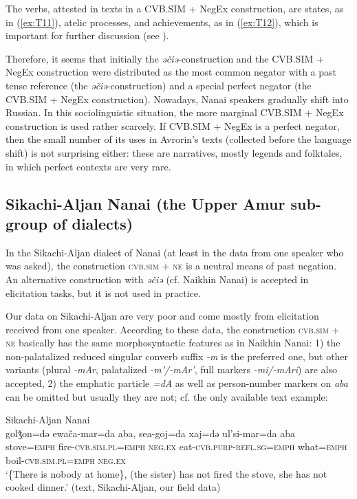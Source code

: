 \documentclass[output=paper]{langscibook}
\begin{document}
The verbs, attested in texts in a CVB.SIM + NegEx construction, are states, as in (\ref{ex:T11}), atelic processes, and achievements, as in (\ref{ex:T12}), which is important for further discussion (see ).

Therefore, it seems that initially the \textit{əčiə}-construction and the CVB.SIM + NegEx construction were distributed as the most common negator with a past tense reference (the \textit{əčiə}-construction) and a special perfect negator (the CVB.SIM + NegEx construction). Nowadays, Nanai speakers gradually shift into Russian. In this sociolinguistic situation, the more marginal CVB.SIM + NegEx construction is used rather scarcely. If CVB.SIM + NegEx is a perfect negator, then the small number of its uses in Avrorin’s texts (collected before the language shift) is not surprising either: these are narratives, mostly legends and folktales, in which perfect contexts are very rare.

\subsection{Sikachi-Aljan Nanai (the Upper Amur sub-group of dialects)}\label{sec:T5.2}

In the Sikachi-Aljan dialect of Nanai (at least in the data from one speaker who was asked), the construction \textsc{cvb.sim + ne} is a neutral means of past negation. An alternative construction with \textit{əčiə} (cf. Naikhin Nanai) is accepted in elicitation tasks, but it is not used in practice.

Our data on Sikachi-Aljan are very poor and come mostly from elicitation received from one speaker. According to these data, the construction \textsc{cvb.sim + ne} basically has the same morphosyntactic features as in Naikhin Nanai: 1) the non-palatalized reduced singular converb suffix \textit{-m} is the preferred one, but other variants (plural \textit{-mAr}, palatalized ­\textit{-m’/-mAr’}, full markers \textit{-mi/-mAri}) are also accepted, 2) the emphatic particle \textit{=dA} as well as person-number markers on \textit{aba} can be omitted but usually they are not; cf. the only available text example:

\ea Sikachi-Aljan Nanai \label{ex:T13}\\
	\gll golǯon=də	ewača-mar=da	aba, sea-goj=da	xaj=də	ul’si-mar=da	aba\\
	stove=\textsc{emph}	fire-\textsc{cvb.sim.pl=emph}	\textsc{neg.ex} eat-\textsc{cvb.purp-refl.sg=emph}	what=\textsc{emph}	boil-\textsc{cvb.sim.pl=emph}	\textsc{neg.ex}\\
	\glt `\{There is nobody at home\}, (the sister) has not fired the stove, she has not cooked dinner.' (text, Sikachi-Aljan, our field data)
\z
\end{document}
